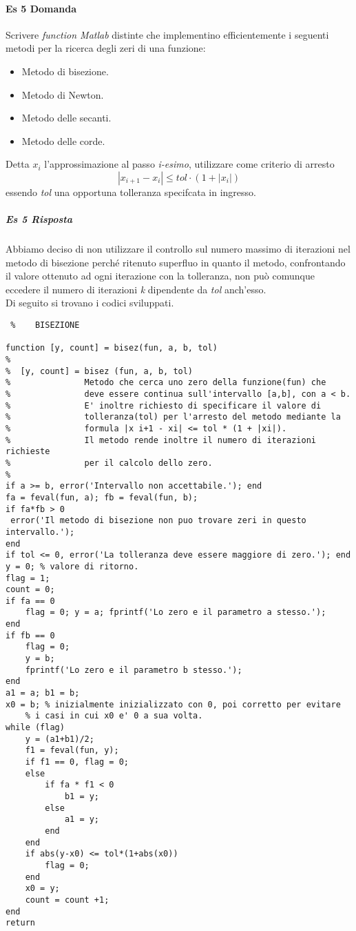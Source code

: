 \documentclass[a4paper]{report}
\begin{document}
\paragraph{Es 5 Domanda}
Scrivere \emph{function Matlab} distinte che implementino efficientemente i seguenti metodi per la ricerca degli zeri di una funzione:
\begin{itemize}
\item Metodo di bisezione. \item Metodo di Newton. \item Metodo delle secanti. \item Metodo delle corde.
\end{itemize}
Detta \emph{$x_i$} l'approssimazione al passo \emph{i-esimo}, utilizzare come criterio di arresto
\[
|x_{i+1}-x_i| \leq tol \cdotp (1+|x_i|)
\]
essendo \emph{tol} una opportuna tolleranza specifcata in ingresso.
\subparagraph{Es 5 Risposta}
Abbiamo deciso di non utilizzare il controllo sul numero massimo di iterazioni nel metodo di bisezione perché ritenuto superfluo in quanto il metodo, confrontando il valore ottenuto ad ogni iterazione con la tolleranza, non può comunque eccedere il numero di iterazioni \emph{k} dipendente da \emph{tol} anch'esso. \\ 
Di seguito si trovano i codici sviluppati.
\newpage
\begin{lstlisting} % 	BISEZIONE

function [y, count] = bisez(fun, a, b, tol)
%
%  [y, count] = bisez (fun, a, b, tol)
%               Metodo che cerca uno zero della funzione(fun) che 
%               deve essere continua sull'intervallo [a,b], con a < b. 
%               E' inoltre richiesto di specificare il valore di 
%               tolleranza(tol) per l'arresto del metodo mediante la 
%               formula |x i+1 - xi| <= tol * (1 + |xi|).
%               Il metodo rende inoltre il numero di iterazioni richieste
%               per il calcolo dello zero.
%
if a >= b, error('Intervallo non accettabile.'); end
fa = feval(fun, a); fb = feval(fun, b);
if fa*fb > 0
 error('Il metodo di bisezione non puo trovare zeri in questo intervallo.');
end
if tol <= 0, error('La tolleranza deve essere maggiore di zero.'); end
y = 0; % valore di ritorno.
flag = 1;
count = 0;
if fa == 0
	flag = 0; y = a; fprintf('Lo zero e il parametro a stesso.');
end 
if fb == 0
	flag = 0;
	y = b;
	fprintf('Lo zero e il parametro b stesso.');
end
a1 = a; b1 = b;
x0 = b; % inizialmente inizializzato con 0, poi corretto per evitare
	% i casi in cui x0 e' 0 a sua volta.
while (flag)
	y = (a1+b1)/2;
	f1 = feval(fun, y);
	if f1 == 0, flag = 0;
	else 
		if fa * f1 < 0
			b1 = y;
		else 
			a1 = y;
		end
	end
	if abs(y-x0) <= tol*(1+abs(x0))
		flag = 0;
	end
	x0 = y;
	count = count +1;
end
return 
\end{lstlisting}
\end{document}
